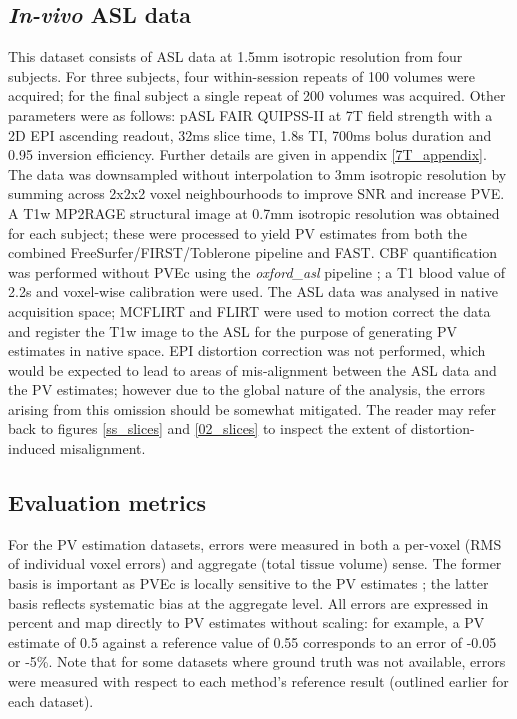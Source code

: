 \subsection{\textit{In-vivo} ASL data} 
This dataset consists of ASL data at 1.5mm isotropic resolution from four subjects. For three subjects, four within-session repeats of 100 volumes were acquired; for the final subject a single repeat of 200 volumes was acquired. Other parameters were as follows: pASL FAIR QUIPSS-II at 7T field strength with a 2D EPI ascending readout, 32ms slice time, 1.8s TI, 700ms bolus duration and 0.95 inversion efficiency. Further details are given in appendix \ref{7T_appendix}. The data was downsampled without interpolation to 3mm isotropic resolution by summing across 2x2x2 voxel neighbourhoods to improve SNR and increase PVE. A T1w MP2RAGE structural image at 0.7mm isotropic resolution was obtained for each subject; these were processed to yield PV estimates from both the combined FreeSurfer/FIRST/Toblerone pipeline and FAST. CBF quantification was performed without PVEc using the \textit{oxford\_asl} pipeline \cite{Chappell2009, oxford-asl}; a T1 blood value of 2.2s \cite{Zhang2013} and voxel-wise calibration were used. The ASL data was analysed in native acquisition space; MCFLIRT and FLIRT \cite{flirt} were used to motion correct the data and register the T1w image to the ASL for the purpose of generating PV estimates in native space. EPI distortion correction was not performed, which would be expected to lead to areas of mis-alignment between the ASL data and the PV estimates; however due to the global nature of the analysis, the errors arising from this omission should be somewhat mitigated. The reader may refer back to figures \ref{ss_slices} and \ref{02_slices} to inspect the extent of distortion-induced misalignment. 

\subsection{Evaluation metrics}

For the PV estimation datasets, errors were measured in both a per-voxel (RMS of individual voxel errors) and aggregate (total tissue volume) sense. The former basis is important as PVEc is locally sensitive to the PV estimates \cite{Zhao2017a}; the latter basis reflects systematic bias at the aggregate level. All errors are expressed in percent and map directly to PV estimates without scaling: for example, a PV estimate of 0.5 against a reference value of 0.55 corresponds to an error of -0.05 or -5\%. Note that for some datasets where ground truth was not available, errors were measured with respect to each method's reference result (outlined earlier for each dataset). 

